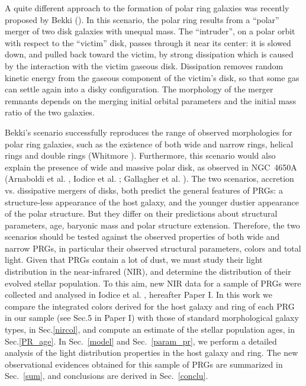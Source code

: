 \documentclass{aa}
\begin{document}
A quite different approach to the formation of polar ring galaxies was recently
proposed by Bekki (\cite{Bekki98}). In this scenario, the polar ring
results from a ``polar'' merger of two disk galaxies with unequal mass.
The ``intruder'', on a polar orbit with respect to the ``victim'' disk,
passes through it near its center: it is slowed down, and pulled back
toward the victim, by strong dissipation which is caused by the interaction
with the victim gaseous disk.                            
Dissipation removes random kinetic energy from the
gaseous component of the victim's disk, so that some gas
can settle again into a disky configuration.
The morphology of the merger remnants depends on the merging
initial orbital parameters and the initial mass ratio of
the two galaxies.
                                                               
Bekki's scenario successfully reproduces the range of observed morphologies
for polar ring galaxies, such as the existence of both
wide and narrow rings, helical rings and double rings  (Whitmore
\cite{whitmore91}).
Furthermore, this scenario would also explain the presence of wide and massive 
polar disk, as observed in NGC~4650A (Arnaboldi et al. \cite{magda97}, 
Iodice et al. \cite{4650aI}; Gallagher et al. \cite{4650aG}).
The two scenarios, accretion vs. dissipative mergers of disks, both
predict the general features of PRGs: a structure-less appearance of the
host galaxy, 
and the younger dustier appearance of the polar structure. 
But they differ on their predictions about structural parameters, age,
baryonic mass and polar structure extension. Therefore, the two
scenarios should be tested against the observed
properties of both  wide and narrow PRGs, in particular their observed 
structural parameters, colors and total light. 
Given that PRGs contain a lot of dust, we
must study their light distribution in the near-infrared (NIR), and
determine the distribution of their evolved stellar population.
To this aim, new NIR data for a sample of PRGs were collected and analysed
in Iodice et al. \cite{paperI}, hereafter Paper I.
In this work we compare the integrated colors derived for the host galaxy 
and ring of each PRG in our sample (see Sec.5 in Paper I) with those of  
standard morphological galaxy types, in Sec.\ref{nircol},
and compute an estimate of the stellar population ages, in Sec.\ref{PR_age}. 
In Sec.~\ref{model} and Sec.~\ref{param_pr}, we perform a detailed
analysis of the light distribution properties in the 
host galaxy and ring.  The new observational evidences obtained for this
sample of PRGs are summarized in Sec.~\ref{sum}, and conclusions are 
derived in Sec.~\ref{conclu}.
        
\end{document}
